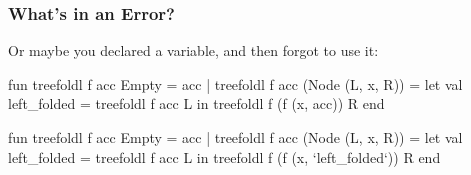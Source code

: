 \documentclass[aspectratio=169, handout]{beamer}
\newcommand{\cmark}{{\color{green!80!black}\ding{51}}}
\newcommand{\xmark}{{\color{red}\ding{55}}}
\begin{document}
\begin{frame}[fragile]
  \frametitle{What's in an Error?}

  Or maybe you declared a variable, and then forgot to use it:

  \pause
  \begin{center}
    \begin{minipage}[t][1.4in][t]{\textwidth}
      \begin{minipage}{0.2\textwidth}
        \centering
        \vspace{\fill}
        {\huge\xmark}
        \vspace{\fill}
      \end{minipage}
      \begin{minipage}{0.75\textwidth}
        {\small
          \begin{codeblock}[rulecolor=\color{red}, framerule=0.3mm]
            fun treefoldl f acc Empty = acc
              | treefoldl f acc (Node (L, x, R)) =
                  let
                    val left_folded = treefoldl f acc L
                  in
                    treefoldl f (f (x, acc)) R
                  end
          \end{codeblock}
          }
        \end{minipage}
    \end{minipage}
    \pause
    \begin{minipage}[t][1.4in][t]{\textwidth}
      \begin{minipage}{0.2\textwidth}
        \centering
        \vspace{\fill}
        {\huge\cmark}
        \vspace{\fill}
      \end{minipage}
      \begin{minipage}{0.75\textwidth}
        {\small
        \begin{codeblock}[rulecolor=\color{green!80!black}, framerule=0.3mm]
          fun treefoldl f acc Empty = acc
            | treefoldl f acc (Node (L, x, R)) =
                let
                  val left_folded = treefoldl f acc L
                in
                  treefoldl f (f (x, `left_folded`)) R
                end
        \end{codeblock}
        }
      \end{minipage}
    \end{minipage}
  \end{center}
\end{frame}
\end{document}

